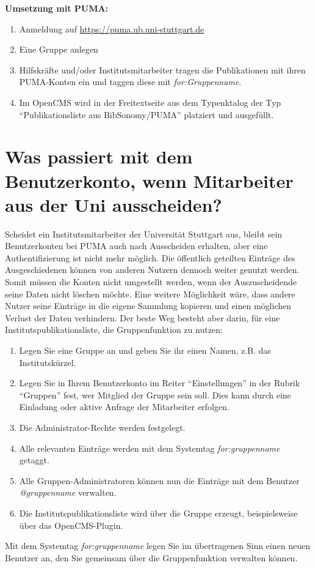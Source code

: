 \textbf{Umsetzung mit PUMA:}
\begin{enumerate}
\item Anmeldung auf \url{https://puma.ub.uni-stuttgart.de} 
\item Eine Gruppe anlegen
\item Hilfskräfte und/oder Institutsmitarbeiter tragen die Publikationen mit ihren PUMA-Konten ein und taggen diese mit \textit{for:Gruppenname}.
\item Im OpenCMS wird in der Freitextseite aus dem Typenktalog der Typ \enquote{Publikationsliste aus BibSonomy/PUMA} platziert und ausgefüllt.
\end{enumerate}

\section{Was passiert mit dem Benutzerkonto, wenn Mitarbeiter aus der Uni ausscheiden?}
Scheidet ein Institutsmitarbeiter der Universität Stuttgart aus, bleibt sein Benutzerkonten bei PUMA auch nach Ausscheiden erhalten, aber eine Authentifizierung ist nicht mehr möglich. Die öffentlich geteilten Einträge des Ausgeschiedenen können von anderen Nutzern dennoch weiter genutzt werden.  Somit müssen die Konten nicht umgestellt werden, wenn der Auszuscheidende seine Daten nicht löschen möchte.\newline\newline
Eine weitere Möglichkeit wäre, dass andere Nutzer seine Einträge in die eigene Sammlung kopieren und einen möglichen Verlust der Daten verhindern. Der beste Weg besteht aber darin, für eine Institutspublikationsliste,
die Gruppenfunktion zu nutzen:
\begin{enumerate}
\item Legen Sie eine Gruppe an und geben Sie ihr einen Namen, z.B. das Institutskürzel.
\item Legen Sie in Ihrem Benutzerkonto im Reiter \enquote{Einstellungen} in der Rubrik \enquote{Gruppen} fest, wer Mitglied der Gruppe sein soll. Dies kann durch eine Einladung oder aktive Anfrage der Mitarbeiter erfolgen. 
\item Die Administrator-Rechte werden festgelegt.
\item Alle relevanten Einträge werden mit dem Systemtag \textit{for:gruppenname} getaggt.
\item Alle Gruppen-Administratoren können nun die Einträge mit dem Benutzer
\textit{@gruppenname} verwalten.
\item Die Institutspublikationsliste wird über die Gruppe erzeugt, beispielsweise über das OpenCMS-Plugin. 
\end{enumerate}
Mit dem Systemtag \textit{for:gruppenname} legen Sie im übertragenen Sinn einen neuen Benutzer an, den Sie gemeinsam über die Gruppenfunktion verwalten können.
